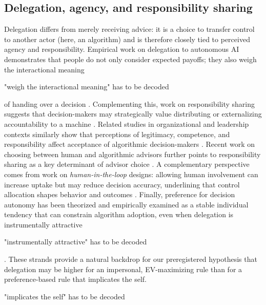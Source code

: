 \documentclass[a4paper, 12pt, fleqn]{article}
\theoremstyle{definition}
\begin{document}
\subsection{Delegation, agency, and responsibility sharing}
Delegation differs from merely receiving advice: it is a choice to transfer control to another actor (here, an algorithm) and is therefore closely tied to perceived agency and responsibility. Empirical work on delegation to autonomous AI demonstrates that people do not only consider expected payoffs; they also weigh the interactional meaning 
\begin{icomm}
	"weigh the interactional meaning" has to be decoded
\end{icomm}
of handing over a decision \citep{Candrian2022}. Complementing this, work on responsibility sharing suggests that decision-makers may strategically value distributing or externalizing accountability to a machine \citep{Kirchkamp2019}. Related studies in organizational and leadership contexts similarly show that perceptions of legitimacy, competence, and responsibility affect acceptance of algorithmic decision-makers \citep{Hoeddinghaus2021}. Recent work on choosing between human and algorithmic advisors further points to responsibility sharing as a key determinant of advisor choice \citep{Gazit2023}. A complementary perspective comes from work on \emph{human-in-the-loop} designs: allowing human involvement can increase uptake but may reduce decision accuracy, underlining that control allocation shapes behavior and outcomes \citep{Sele2024}. Finally, preference for decision autonomy has been theorized and empirically examined as a stable individual tendency that can constrain algorithm adoption, even when delegation is instrumentally attractive 
\begin{icomm}
	"instrumentally attractive" has to be decoded
\end{icomm}
\citep{Ivanova-Stenzel2025}. These strands provide a natural backdrop for our preregistered hypothesis that delegation may be higher for an impersonal, EV-maximizing rule than for a preference-based rule that implicates the self.
\begin{icomm}
	"implicates the self" has to be decoded
\end{icomm}
\end{document}
